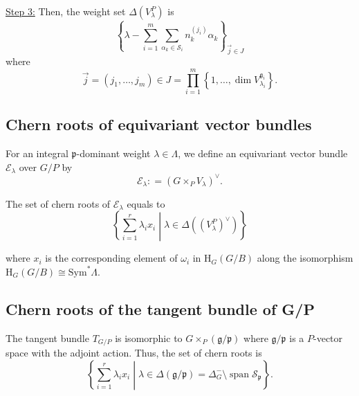 \documentclass[uplatex,dvipdfmx]{jsarticle}
\newcommand{\defeq}{\mathrel{\mathop:}=}
\newcommand{\Sym}{\mathrm{Sym}}
\begin{document}
\underline{Step 3:}
Then, the weight set 
$\Delta(V_\lambda^P)$
is
\begin{equation}
    \left\{ 
        \lambda 
        - 
        \sum_{i = 1}^m
        \sum_{\alpha_k \in \mathcal{S}_i} 
        n_k^{(j_i)} \alpha_k
    \right\}_{\vec{j} \in J}
\end{equation}
where
\begin{equation}
    \vec{j}
    =
    \left( j_1, \ldots, j_m \right)
    \in
    J
    =
    \prod_{i = 1}^m
    \left\{ 1, \ldots, \operatorname{dim} V^{\mathfrak{g}_i}_{\lambda_i} \right\}.
\end{equation}

\subsection{Chern roots of equivariant vector bundles}

For an integral
$\mathfrak{p}$-dominant
weight
$\lambda \in \Lambda$,
we define an equivariant vector bundle 
$\mathcal{E}_\lambda$
over
$G/P$
by
\begin{equation}
    \mathcal{E}_\lambda
    \defeq
    \left( 
        G
        \times_P
        V_\lambda
     \right)^{\vee}.
\end{equation}

The set of chern roots of
$\mathcal{E}_\lambda$
equals to
\begin{equation}
    \left\{ 
        \sum_{i = 1}^r
        \lambda_i
        x_i
        \middle|
        \lambda \in \Delta((V_\lambda^P)^{\vee})
    \right\}
\end{equation}

where
$x_i$
is the corresponding element of
$\omega_i$
in
$\mathrm{H}_G(G/B)$
along the isomorphism
$\mathrm{H}_G(G/B) \cong \Sym^* \Lambda$.

\subsection{Chern roots of the tangent bundle of G/P}

The tangent bundle 
$T_{G/P}$
is isomorphic to
$G \times_P (\mathfrak{g}/\mathfrak{p})$
where
$\mathfrak{g}/\mathfrak{p}$
is a 
$P$-vector space 
with the adjoint action.
Thus, the set of chern roots is
\begin{equation}
    \left\{ 
        \sum_{i = 1}^r
        \lambda_i
        x_i
        \middle|
        \lambda \in \Delta(\mathfrak{g}/\mathfrak{p})
        =
        \Delta^-_G 
        \setminus
        \operatorname{span} \mathcal{S}_\mathfrak{p}
    \right\}.
\end{equation}
\end{document}
